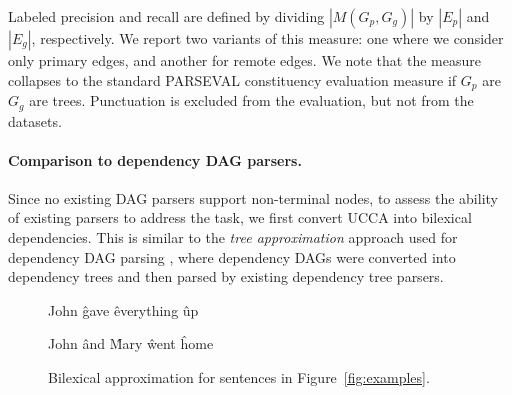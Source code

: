 \documentclass[11pt]{article}
\newcommand{\figref}[1]{Figure~\ref{#1}}
\begin{document}
\vspace{-.6cm}

Labeled precision and recall are defined by dividing $|M(G_p,G_g)|$ by $|E_p|$ and $|E_g|$, respectively.
We report two variants of this measure: one where we consider only primary edges,
and another for remote edges. We note that the measure collapses to the standard
PARSEVAL constituency evaluation measure if $G_p$ are $G_g$ are trees.
Punctuation is excluded from the evaluation, but not from the datasets.

\paragraph{Comparison to dependency DAG parsers.}
Since no existing DAG parsers support non-terminal nodes,
to assess the ability of existing parsers to address the task,
we first convert UCCA into bilexical dependencies.
This is similar to the \textit{tree approximation} approach used for dependency DAG parsing
\cite{agic2015semantic,fernandez2015parsing},
where dependency DAGs were converted into dependency trees
and then parsed by existing dependency tree parsers.

\begin{figure}[ht]
\centering
{}
\begin{dependency}[theme = simple]
\begin{deptext}[column sep=.7em,ampersand replacement=\^]
John \^ gave \^ everything \^ up \\
\end{deptext}
\end{dependency}
\begin{dependency}[theme = simple]
\begin{deptext}[column sep=.7em,ampersand replacement=\^]
John \^ and \^ Mary \^ went \^ home \\
\end{deptext}
\end{dependency}
\caption{Bilexical approximation for sentences in \figref{fig:examples}.}
\label{fig:bilexical_example}
\end{figure}
\end{document}
